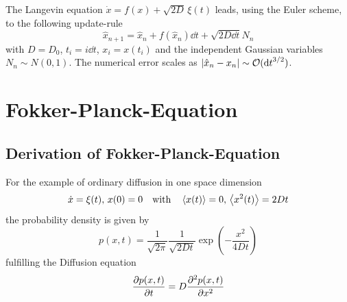 \documentclass{notebook}
\begin{document}
\begin{theorem}
	The Langevin equation $\dot{x} = f(x) + \sqrt{2D} \, \xi(t)$ leads, using the Euler scheme, to the following update-rule
	\begin{equation}
	\hat{x}_{n+1} = \hat{x}_n + f(\hat{x}_n) \dd{t} + \sqrt{2 D \dd{t}} N_n
	\end{equation}
	with $D = D_0$, $t_i = i \dd{t}$, $x_i = x(t_i)$ and the independent Gaussian variables $N_n \sim N(0,1)$. The numerical error scales as $|\hat{x}_n - x_n| \sim \mathcal{O}(\dd{t}^{3/2})$.
\end{theorem}

\section{Fokker-Planck-Equation}

\subsection*{Derivation of Fokker-Planck-Equation}

\begin{remark}
	
	For the example of ordinary diffusion in one space dimension
	\begin{equation}
	\dot{x} = \xi(t), \, x(0) = 0 \quad \mathrm{with} \quad \expval{x(t)} = 0, \, \expval{x^2(t)} = 2 D t
	\end{equation}
	the probability density is given by
	\begin{equation}
	p(x,t) = \frac{1}{\sqrt{2 \pi}} \frac{1}{\sqrt{2 D t}} \exp(-\frac{x^2}{4 D t})
	\end{equation}
	fulfilling the Diffusion equation
	\begin{equation}
	\pdv{p(x,t)}{t} = D \pdv[2]{p(x,t)}{x}
	\end{equation}
\end{remark}
\end{document}
